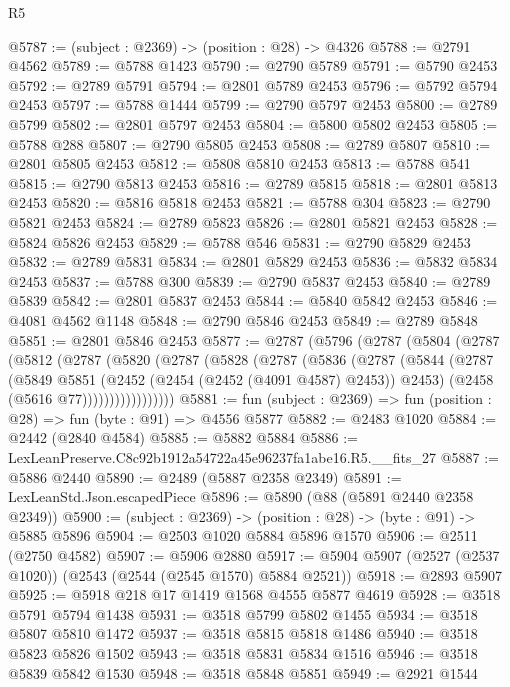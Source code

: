 \begin{lexlean}{R5}
\begin{coremodule}
@5787 := (subject : @2369) -> (position : @28) -> @4326
@5788 := @2791 @4562
@5789 := @5788 @1423
@5790 := @2790 @5789
@5791 := @5790 @2453
@5792 := @2789 @5791
@5794 := @2801 @5789 @2453
@5796 := @5792 @5794 @2453
@5797 := @5788 @1444
@5799 := @2790 @5797 @2453
@5800 := @2789 @5799
@5802 := @2801 @5797 @2453
@5804 := @5800 @5802 @2453
@5805 := @5788 @288
@5807 := @2790 @5805 @2453
@5808 := @2789 @5807
@5810 := @2801 @5805 @2453
@5812 := @5808 @5810 @2453
@5813 := @5788 @541
@5815 := @2790 @5813 @2453
@5816 := @2789 @5815
@5818 := @2801 @5813 @2453
@5820 := @5816 @5818 @2453
@5821 := @5788 @304
@5823 := @2790 @5821 @2453
@5824 := @2789 @5823
@5826 := @2801 @5821 @2453
@5828 := @5824 @5826 @2453
@5829 := @5788 @546
@5831 := @2790 @5829 @2453
@5832 := @2789 @5831
@5834 := @2801 @5829 @2453
@5836 := @5832 @5834 @2453
@5837 := @5788 @300
@5839 := @2790 @5837 @2453
@5840 := @2789 @5839
@5842 := @2801 @5837 @2453
@5844 := @5840 @5842 @2453
@5846 := @4081 @4562 @1148
@5848 := @2790 @5846 @2453
@5849 := @2789 @5848
@5851 := @2801 @5846 @2453
@5877 := @2787
    (@5796
      (@2787
        (@5804
          (@2787
            (@5812
              (@2787
                (@5820
                  (@2787
                    (@5828
                      (@2787
                        (@5836
                          (@2787
                            (@5844
                              (@2787
                                (@5849
                                  @5851
                                  (@2452 (@2454 (@2452 (@4091 @4587) @2453)) @2453)
                                  (@2458 (@5616 @77)))))))))))))))))
@5881 := fun (subject : @2369) => fun (position : @28) => fun (byte : @91) => @4556 @5877
@5882 := @2483 @1020
@5884 := @2442 (@2840 @4584)
@5885 := @5882 @5884
@5886 := LexLeanPreserve.C8c92b1912a54722a45e96237fa1abe16.R5.__fits_27
@5887 := @5886 @2440
@5890 := @2489 (@5887 @2358 @2349)
@5891 := LexLeanStd.Json.escapedPiece
@5896 := @5890 (@88 (@5891 @2440 @2358 @2349))
@5900 := (subject : @2369) -> (position : @28) -> (byte : @91) -> @5885 @5896
@5904 := @2503 @1020 @5884 @5896 @1570
@5906 := @2511 (@2750 @4582)
@5907 := @5906 @2880
@5917 := @5904 @5907 (@2527 (@2537 @1020)) (@2543 (@2544 (@2545 @1570) @5884 @2521))
@5918 := @2893 @5907
@5925 := @5918 @218 @17 @1419 @1568 @4555 @5877 @4619
@5928 := @3518 @5791 @5794 @1438
@5931 := @3518 @5799 @5802 @1455
@5934 := @3518 @5807 @5810 @1472
@5937 := @3518 @5815 @5818 @1486
@5940 := @3518 @5823 @5826 @1502
@5943 := @3518 @5831 @5834 @1516
@5946 := @3518 @5839 @5842 @1530
@5948 := @3518 @5848 @5851
@5949 := @2921 @1544

\end{coremodule}
\end{lexlean}
